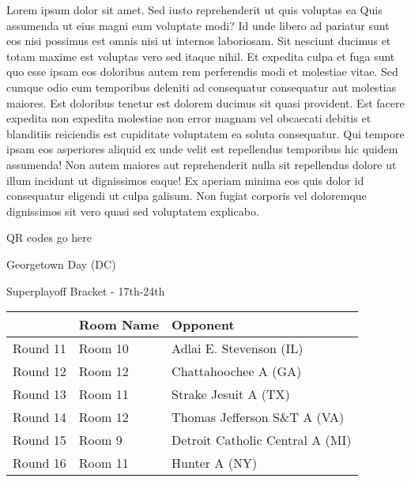 \documentclass{article}%
\begin{document}
\vspace*{8pt}%
\linebreak%
\newline%
\newline%
    Lorem ipsum dolor sit amet. Sed iusto reprehenderit ut quis voluptas ea Quis assumenda ut eius magni eum voluptate modi? Id unde libero ad pariatur sunt eos nisi possimus est omnis nisi ut internos laboriosam. Sit nesciunt ducimus et totam maxime est voluptas vero sed itaque nihil. Et expedita culpa et fuga sunt quo esse ipsam eos doloribus autem rem perferendis modi et molestiae vitae.\newline%
\newline%
    Sed cumque odio eum temporibus deleniti ad consequatur consequatur aut molestias maiores. Est doloribus tenetur est dolorem ducimus sit quasi provident. Est facere expedita non expedita molestiae non error magnam vel obcaecati debitis et blanditiis reiciendis est cupiditate voluptatem ea soluta consequatur. Qui tempore ipsam eos asperiores aliquid ex unde velit est repellendus temporibus hic quidem assumenda!\newline%
\newline%
    Non autem maiores aut reprehenderit nulla sit repellendus dolore ut illum incidunt ut dignissimos eaque! Ex aperiam minima eos quis dolor id consequatur eligendi ut culpa galisum. Non fugiat corporis vel doloremque dignissimos sit vero quasi sed voluptatem explicabo.\newline%
\newline%
\vspace*{30pt}%
\begin{center}%
\begin{Huge}%
QR codes go here%
\end{Huge}%
\end{center}%
\newpage%
\begin{center}%
\begin{Huge}%
Georgetown Day (DC)%
\end{Huge}%
\vspace*{8pt}%
\linebreak%
\begin{Large}%
Superplayoff Bracket {-} 17th{-}24th%
\end{Large}%
\end{center}%
%
\begin{tabularx}{\textwidth}{|c|Y|Y|}%
\hline%
&Room Name&Opponent\\%
\hline%
Round 11&Room 10&Adlai E. Stevenson (IL)\\%
Round 12&Room 12&Chattahoochee A (GA)\\%
Round 13&Room 11&Strake Jesuit A (TX)\\%
Round 14&Room 12&Thomas Jefferson S\&T A (VA)\\%
Round 15&Room 9&Detroit Catholic Central A (MI)\\%
Round 16&Room 11&Hunter A (NY)\\%
\hline%
\end{tabularx}%
\end{document}
